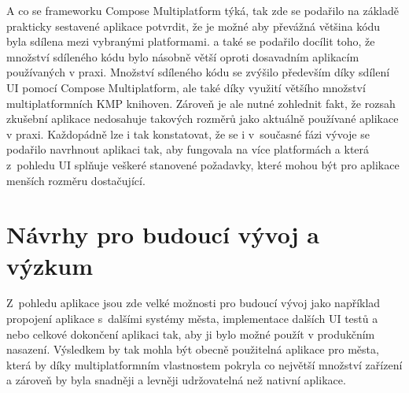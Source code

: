\medskip

A co se frameworku Compose Multiplatform týká, tak zde se podařilo na základě prakticky sestavené aplikace potvrdit, že je možné 
aby převážná většina kódu byla sdílena mezi vybranými platformami. a také se podařilo docílit toho, že množství sdíleného kódu bylo násobně 
větší oproti dosavadním aplikacím používaných v praxi. Množství sdíleného kódu se zvýšilo především díky sdílení UI pomocí Compose Multiplatform,
ale také díky využití většího množství multiplatformních KMP knihoven. 
Zároveň je ale nutné zohlednit fakt, že rozsah zkušební aplikace nedosahuje 
takových rozměrů jako aktuálně používané aplikace v praxi. Každopádně lze i tak konstatovat, že se i v~současné fázi vývoje se podařilo navrhnout
aplikaci tak, aby fungovala na více platformách a která z~pohledu UI splňuje veškeré stanovené požadavky, které mohou být pro aplikace 
menších rozměru dostačující. 

\bigskip

\section{Návrhy pro budoucí vývoj a výzkum}
Z~pohledu aplikace jsou zde velké možnosti pro budoucí vývoj jako například propojení aplikace s~dalšími systémy města,
implementace dalších UI testů a nebo celkové dokončení aplikaci tak, aby ji bylo možné použít v produkčním nasazení. Výsledkem by tak mohla 
být obecně použitelná aplikace pro města, která by díky multiplatformním vlastnostem pokryla co největší množství zařízení a zároveň by 
byla snadněji a levněji udržovatelná než nativní aplikace.






